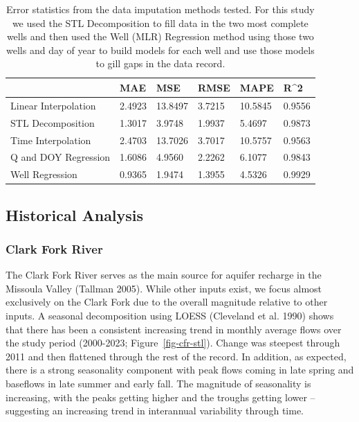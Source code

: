 \documentclass[
  letterpaper,
  DIV=11,
  numbers=noendperiod]{scrartcl}
\begin{document}
\begin{longtable}[]{@{}llllll@{}}

\caption{\label{tbl-error-stats}Error statistics from the data
imputation methods tested. For this study we used the STL Decomposition
to fill data in the two most complete wells and then used the Well (MLR)
Regression method using those two wells and day of year to build models
for each well and use those models to gill gaps in the data record.}

\tabularnewline

\toprule\noalign{}
& MAE & MSE & RMSE & MAPE & R\^{}2 \\
\midrule\noalign{}
\endhead
\bottomrule\noalign{}
\endlastfoot
Linear Interpolation & 2.4923 & 13.8497 & 3.7215 & 10.5845 & 0.9556 \\
STL Decomposition & 1.3017 & 3.9748 & 1.9937 & 5.4697 & 0.9873 \\
Time Interpolation & 2.4703 & 13.7026 & 3.7017 & 10.5757 & 0.9563 \\
Q and DOY Regression & 1.6086 & 4.9560 & 2.2262 & 6.1077 & 0.9843 \\
Well Regression & 0.9365 & 1.9474 & 1.3955 & 4.5326 & 0.9929 \\

\end{longtable}

\subsection{Historical Analysis}\label{historical-analysis}

\subsubsection{Clark Fork River}\label{clark-fork-river}

The Clark Fork River serves as the main source for aquifer recharge in
the Missoula Valley (Tallman 2005). While other inputs exist, we focus
almost exclusively on the Clark Fork due to the overall magnitude
relative to other inputs. A seasonal decomposition using LOESS
(Cleveland et al. 1990) shows that there has been a consistent
increasing trend in monthly average flows over the study period
(2000-2023; Figure~\ref{fig-cfr-stl}). Change was steepest through 2011
and then flattened through the rest of the record. In addition, as
expected, there is a strong seasonality component with peak flows coming
in late spring and baseflows in late summer and early fall. The
magnitude of seasonality is increasing, with the peaks getting higher
and the troughs getting lower -- suggesting an increasing trend in
interannual variability through time.
\end{document}
